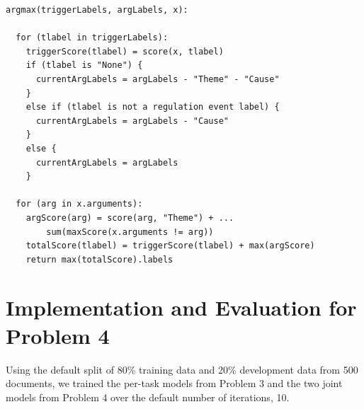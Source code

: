 \documentclass{article} %
\begin{document}
\begin{verbatim}
argmax(triggerLabels, argLabels, x):
  
  for (tlabel in triggerLabels):
    triggerScore(tlabel) = score(x, tlabel)
    if (tlabel is "None") {
      currentArgLabels = argLabels - "Theme" - "Cause"
    }
    else if (tlabel is not a regulation event label) {
      currentArgLabels = argLabels - "Cause"
    }
    else {
      currentArgLabels = argLabels
    }
  
  for (arg in x.arguments):
    argScore(arg) = score(arg, "Theme") + ...
        sum(maxScore(x.arguments != arg))
    totalScore(tlabel) = triggerScore(tlabel) + max(argScore)
    return max(totalScore).labels
\end{verbatim}

\section{Implementation and Evaluation for Problem 4}

Using the default split of 80\% training data and 20\% development data from 500 documents, we trained the per-task models from Problem 3 and the two joint models from Problem 4 over the default number of iterations, 10.
\end{document}
